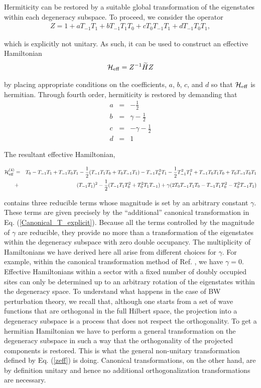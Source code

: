 \documentclass[floatfix,twocolumn,aps,prb,showpacs,superscriptaddress]{revtex4}
\newcommand{\beq}{\begin{eqnarray}}
\newcommand{\eeq}{\end{eqnarray}
}\def\tm{T_{-1}}
\def\tone{T_1}
\def\tzero{T_0}
\begin{document}
Hermiticity can be restored by a suitable global transformation of the
eigenstates within each degeneracy subspace.  To proceed, we consider
the operator 
\beq\label{zeff}
Z=1+aT_{-1}T_1+bT_{-1}T_1T_0+cT_0T_{-1}T_1+dT_{-1}T_0T_1 , \nonumber
\eeq
which is explicitly not unitary.
 As such, it can be used to construct an effective Hamiltonian
\beq
{\cal H}_{\rm eff}=Z^{-1}\widetilde{H}Z
\eeq
by placing appropriate conditions on the coefficients, $a$, $b$, $c$, and $d$
so that ${\cal H}_{\rm eff}$ is hermitian.
Through fourth order, hermiticity is restored by demanding that
\beq
a&=&-\frac12\nonumber\\
b&=&\gamma-\frac12\\
c&=&-\gamma-\frac12\nonumber\\
d&=& 1\nonumber
\eeq
The resultant effective Hamiltonian,
\begin{widetext}
\beq
{\cal H}^{(4)}_{\rm eff}&=&\tzero-\tm\tone+\tm\tzero\tone-\frac12(\tm\tone\tzero+\tzero\tm\tone)
-\tm\tzero^2\tone-\frac12\tm^2\tone^2+\tm\tzero\tone\tzero+\tzero\tm\tzero\tone\nonumber\\
&+&(\tm\tone)^2-\frac12(\tm\tone\tzero^2+\tzero^2\tone\tm)
+\gamma(2\tzero\tm\tone\tzero-\tm\tone\tzero^2-\tzero^2\tm\tone)
\eeq
\end{widetext}
contains three reducible terms whose magnitude is set by an arbitrary
 constant $\gamma$.  These terms are given precisely by the ``additional''
canonical transformation in Eq. (\ref{Canonical_T_explicit}). 
 Because all the terms controlled by the magnitude
of $\gamma$ are reducible, they provide no more than a transformation of the eigenstates
within the degeneracy subspace with zero double occupancy.  The
 multiplicity of Hamiltonians we have derived here all arise from
 different choices for $\gamma$. 
For example, 
within the canonical transformation method of
 Ref. , we have $\gamma=0$.  Effective
 Hamiltonians 
within a sector with a fixed number of doubly occupied sites can only
 be determined up to an arbitrary rotation of the eigenstates within
 the degeneracy space.  To understand what happens in the case of BW
 perturbation theory, we recall that, although one starts from a set
 of wave functions that are orthogonal in the full Hilbert space, the
 projection into a degeneracy subspace is a process that does not
 respect the orthogonality. To get a hermitian Hamiltonian we have to
 perform a general transformation on the degeneracy subspace in such a
 way that the orthogonality of the projected components is
 restored. This is what the general non-unitary transformation defined
 by Eq. (\ref{zeff}) is doing. Canonical transformations, on the other
 hand, are by definition unitary and hence no additional
 orthogonalization transformations are
 necessary.\cite{Eskes:1994,Harris:1967} 
\end{document}

